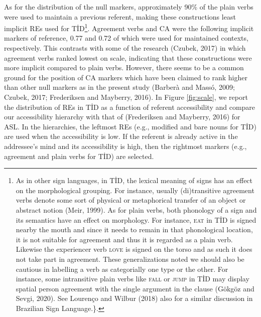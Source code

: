 \documentclass[]{elsarticle} %
\begin{document}
As for the distribution of the null markers, approximately 90\% of the
plain verbs were used to maintain a previous referent, making these
constructions least implicit REs used for TİD\footnote{As in other sign
  languages, in TİD, the lexical meaning of signs has an effect on the
  morphological grouping. For instance, usually (di)transitive agreement
  verbs denote some sort of physical or metaphorical transfer of an
  object or abstract notion (Meir, 1999). As for plain verbs, both
  phonology of a sign and its semantics have an effect on morphology.
  For instance, \textsc{eat} in TİD is signed nearby the mouth and since
  it needs to remain in that phonological location, it is not suitable
  for agreement and thus it is regarded as a plain verb. Likewise the
  experiencer verb \textsc{love} is signed on the torso and as such it
  does not take part in agreement. These generalizations noted we should
  also be cautious in labelling a verb as categorially one type or the
  other. For instance, some intransitive plain verbs like \textsc{fall}
  or \textsc{jump} in TİD may display spatial person agreement with the
  single argument in the clause (Gökgöz and Sevgi, 2020). See Lourenço
  and Wilbur (2018) also for a similar discussion in Brazilian Sign
  Language.\}.}. Agreement verbs and CA were the following implicit
markers of reference, 0.77 and 0.72 of which were used for maintained
contexts, respectively. This contrasts with some of the research
(Czubek, 2017) in which agreement verbs ranked lowest on scale,
indicating that these constructions were more implicit compared to plain
verbs. However, there seems to be a common ground for the position of CA
markers which have been claimed to rank higher than other null markers
as in the present study (Barberà and Massó, 2009; Czubek, 2017;
Frederiksen and Mayberry, 2016). In Figure \ref{fig:scale}, we report
the distribution of REs in TİD as a function of referent accessibility
and compare our accessibility hierarchy with that of (Frederiksen and
Mayberry, 2016) for ASL. In the hierarchies, the leftmost REs (e.g.,
modified and bare nouns for TİD) are used when the accessibility is low.
If the referent is already active in the addressee's mind and its
accessibility is high, then the rightmost markers (e.g., agreement and
plain verbs for TİD) are selected.
\end{document}
